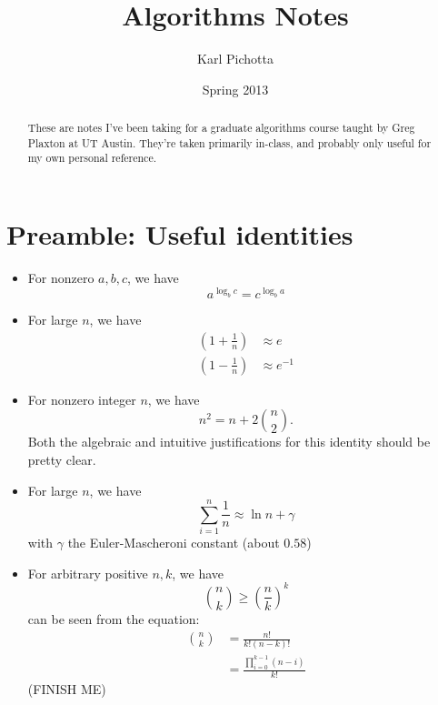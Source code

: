 \documentclass{article}
\title{Algorithms Notes}
\author{Karl Pichotta}
\date{Spring 2013}
\newcommand{\inv}{^{-1}}
\newcommand{\beq}{\begin{equation}}
\newcommand{\eeq}{\end{equation}}
\begin{document}
\maketitle

\begin{abstract}
These are  notes I've been taking for a graduate algorithms
course taught by Greg Plaxton at UT Austin.
They're taken primarily in-class, and probably only useful for my own
 personal reference.
\end{abstract}

\tableofcontents

\section{Preamble: Useful identities}




\begin{itemize}

	\item For nonzero $a,b,c$, we have
	\beq
	a^{\log_b c} = 
	c^{\log_b a}
	\eeq

	\item
	For large $n$, we have
	\begin{align}
		\left(
			1 + \frac{1}{n}
		\right)
		&\approx 
		e
		\\
		\left(
			1 - \frac{1}{n}
		\right)
		&\approx 
		e\inv
	\end{align}
	
	\item For nonzero integer $n$, we have
	\beq
	n^2 = n + 2{n\choose 2}.
	\eeq
	Both the algebraic and intuitive justifications for this identity
	should be pretty clear.
	
	\item
	For large $n$, we have
	$$
	\sum_{i=1}^n \frac{1}{n} \approx \ln n + \gamma
	$$
	with $\gamma$ the Euler-Mascheroni constant (about $0.58$)
	
	
	
	\item
	For arbitrary positive $n,k$, we have
	$$
	{n\choose k} \geq 
	\left(\frac{n}{k}\right)^k
	$$
	can be seen from the equation:
	\begin{align*}
	{n\choose k} 
	&=
	\frac{n!}{k! (n-k)!}
	\\
	&=
	\frac{\prod_{i=0}^{k-1}(n-i)}
		 {k!}
	\end{align*}
	(FINISH ME)
	
	

\end{itemize}
\end{document}
